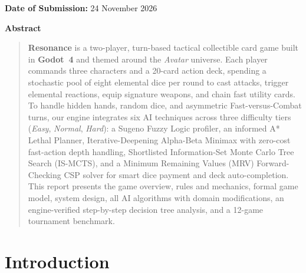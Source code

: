 \documentclass[11pt,a4paper]{article}
\begin{document}
\begin{titlepage}
\begin{minipage}{0.90\textwidth}
\vfill

\begin{center}
  {\small\color{slate}\textbf{Date of Submission:} 24 November 2026}
\end{center}
\vspace{0.4cm}
\end{minipage}
\end{titlepage}

\setcounter{page}{1}

\begin{center}
  {\large\bfseries\color{navy} Abstract}
\end{center}
\vspace{-0.25cm}
\begin{quote}\small
\textbf{Resonance} is a two-player, turn-based tactical collectible card game built in \textbf{Godot~4} and themed around the \emph{Avatar} universe. Each player commands three characters and a 20-card action deck, spending a stochastic pool of eight elemental dice per round to cast attacks, trigger elemental reactions, equip signature weapons, and chain fast utility cards. To handle hidden hands, random dice, and asymmetric Fast-versus-Combat turns, our engine integrates six AI techniques across three difficulty tiers (\emph{Easy}, \emph{Normal}, \emph{Hard}): a Sugeno Fuzzy Logic profiler, an informed A* Lethal Planner, Iterative-Deepening Alpha-Beta Minimax with zero-cost fast-action depth handling, Shortlisted Information-Set Monte Carlo Tree Search (IS-MCTS), and a Minimum Remaining Values (MRV) Forward-Checking CSP solver for smart dice payment and deck auto-completion. This report presents the game overview, rules and mechanics, formal game model, system design, all AI algorithms with domain modifications, an engine-verified step-by-step decision tree analysis, and a 12-game tournament benchmark.
\end{quote}

\vspace{-0.35cm}
{\footnotesize{}\tableofcontents}
\newpage

\section{Introduction}
\end{document}
